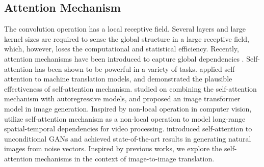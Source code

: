 \subsection{Attention Mechanism}
The convolution operation has a local receptive field. Several layers and large kernel sizes are required to sense the global structure in a large receptive field, which, however, loses the computational and statistical efficiency. Recently, attention mechanisms have been introduced to capture global dependencies \cite{AlignTranslate,ShowAttenTell}.
Self-attention \cite{Non-local,SAGANs} has been shown to be powerful in a variety of tasks.
\cite{Attention} applied self-attention to machine translation models, and demonstrated the plausible effectiveness of self-attention mechanism. 
\cite{Transformer} studied on combining the self-attention mechanism with autoregressive models, and proposed an image transformer model in image generation. 
Inspired by non-local operation in computer vision, \cite{Non-local} utilize self-attention mechanism as a non-local operation to model long-range spatial-temporal dependencies for video processing.
\cite{SAGANs} introduced self-attention to unconditional GANs and achieved state-of-the-art results in generating natural images from noise vectors. Inspired by previous works,  we explore the self-attention mechanisms in the context of image-to-image translation. 

